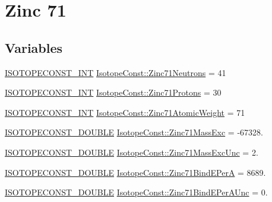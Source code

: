 \hypertarget{group___isotope_const-_zinc-_zn71}{}\section{Zinc 71}
\label{group___isotope_const-_zinc-_zn71}
\subsection*{Variables}
\begin{DoxyCompactItemize}
\item 
\mbox{\hyperlink{group___isotope_const-_macros_ga5f18360b3e99483a35c32d789e62621c}{I\+S\+O\+T\+O\+P\+E\+C\+O\+N\+S\+T\+\_\+\+I\+NT}} \mbox{\hyperlink{group___isotope_const-_zinc-_zn71_ga7408b90101e8004d1c9794962745de38}{Isotope\+Const\+::\+Zinc71\+Neutrons}} = 41
\item 
\mbox{\hyperlink{group___isotope_const-_macros_ga5f18360b3e99483a35c32d789e62621c}{I\+S\+O\+T\+O\+P\+E\+C\+O\+N\+S\+T\+\_\+\+I\+NT}} \mbox{\hyperlink{group___isotope_const-_zinc-_zn71_gac93d23b80ab1903c2a12b11cfb0e3bc0}{Isotope\+Const\+::\+Zinc71\+Protons}} = 30
\item 
\mbox{\hyperlink{group___isotope_const-_macros_ga5f18360b3e99483a35c32d789e62621c}{I\+S\+O\+T\+O\+P\+E\+C\+O\+N\+S\+T\+\_\+\+I\+NT}} \mbox{\hyperlink{group___isotope_const-_zinc-_zn71_ga7dfb33daeedcc5d17bab3b6b0942488a}{Isotope\+Const\+::\+Zinc71\+Atomic\+Weight}} = 71
\item 
\mbox{\hyperlink{group___isotope_const-_macros_ga8f45a7272ce02c0b4c65c44636ed719a}{I\+S\+O\+T\+O\+P\+E\+C\+O\+N\+S\+T\+\_\+\+D\+O\+U\+B\+LE}} \mbox{\hyperlink{group___isotope_const-_zinc-_zn71_ga83ffb11b546a2e7db729b10a280f9015}{Isotope\+Const\+::\+Zinc71\+Mass\+Exc}} = -\/67328.
\item 
\mbox{\hyperlink{group___isotope_const-_macros_ga8f45a7272ce02c0b4c65c44636ed719a}{I\+S\+O\+T\+O\+P\+E\+C\+O\+N\+S\+T\+\_\+\+D\+O\+U\+B\+LE}} \mbox{\hyperlink{group___isotope_const-_zinc-_zn71_gabe77c728de28f9890b247f4a7b445abc}{Isotope\+Const\+::\+Zinc71\+Mass\+Exc\+Unc}} = 2.
\item 
\mbox{\hyperlink{group___isotope_const-_macros_ga8f45a7272ce02c0b4c65c44636ed719a}{I\+S\+O\+T\+O\+P\+E\+C\+O\+N\+S\+T\+\_\+\+D\+O\+U\+B\+LE}} \mbox{\hyperlink{group___isotope_const-_zinc-_zn71_ga159021c33236abf46f23fea87ada8b58}{Isotope\+Const\+::\+Zinc71\+Bind\+E\+PerA}} = 8689.
\item 
\mbox{\hyperlink{group___isotope_const-_macros_ga8f45a7272ce02c0b4c65c44636ed719a}{I\+S\+O\+T\+O\+P\+E\+C\+O\+N\+S\+T\+\_\+\+D\+O\+U\+B\+LE}} \mbox{\hyperlink{group___isotope_const-_zinc-_zn71_ga310534fffff4c96a2f80b0304d8a1a55}{Isotope\+Const\+::\+Zinc71\+Bind\+E\+Per\+A\+Unc}} = 0.

\end{DoxyCompactItemize}
